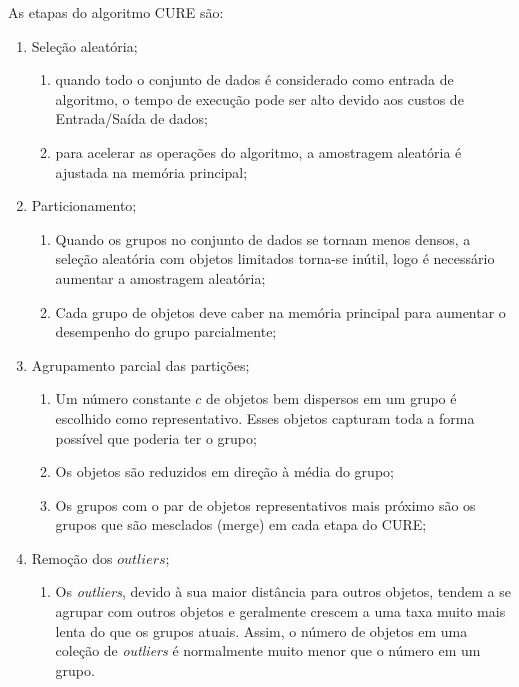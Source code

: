 As etapas do algoritmo \acrshort{CURE} são:

\begin{enumerate}
    \item Seleção aleatória;
        \begin{enumerate}
            \item quando todo o conjunto de dados é considerado como entrada de algoritmo, o tempo de execução pode ser alto devido aos custos de Entrada/Saída de dados;
            \item para acelerar as operações do algoritmo, a amostragem aleatória é ajustada na memória principal;
        \end{enumerate}
    \item Particionamento;
        \begin{enumerate}
            \item Quando os grupos no conjunto de dados se tornam menos densos, a seleção aleatória com objetos limitados torna-se inútil, logo é necessário aumentar a amostragem aleatória;
            \item Cada grupo de objetos deve caber na memória principal para aumentar o desempenho do grupo parcialmente;
        \end{enumerate}
    \item Agrupamento parcial das partições;
        \begin{enumerate}
            \item Um número constante ${c}$ de objetos bem dispersos em um grupo é escolhido como representativo. Esses objetos capturam toda a forma possível que poderia ter o grupo;
            \item Os objetos são reduzidos em direção à média do grupo;
            \item Os grupos com o par de objetos representativos mais próximo são os grupos que são mesclados (merge) em cada etapa do \acrshort{CURE};
        \end{enumerate}
    \item Remoção dos ${outliers}$;
        \begin{enumerate}
            \item Os \textit{outliers}, devido à sua maior distância para outros objetos, tendem a se agrupar com outros objetos e geralmente crescem a uma taxa muito mais lenta do que os grupos atuais. Assim, o número de objetos em uma coleção de \textit{outliers} é normalmente muito menor que o número em um grupo.
        \end{enumerate}

\end{enumerate}
